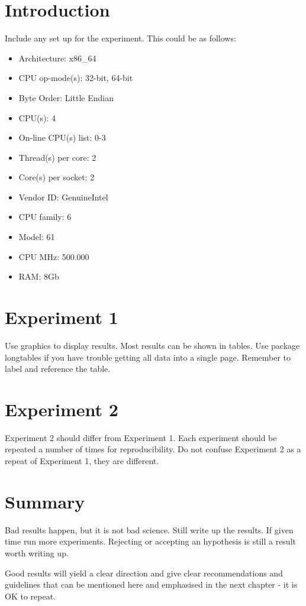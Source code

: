 \section{Introduction}
Include any set up for the experiment. This could be as follows:
\begin{itemize}
\item Architecture:          x86\_64
\item CPU op-mode(s):        32-bit, 64-bit
\item Byte Order:            Little Endian
\item CPU(s):                4
\item On-line CPU(s) list:   0-3
\item Thread(s) per core:    2
\item Core(s) per socket:    2
\item Vendor ID:             GenuineIntel
\item CPU family:            6
\item Model:                 61
\item CPU MHz:               500.000
\item RAM:					 8Gb
\end{itemize}
\section{Experiment 1}
Use graphics to display results. Most results can be shown in tables. Use package longtables if you have trouble getting all data into a single page. Remember to label and reference the table.

\section{Experiment 2}
Experiment 2 should differ from Experiment 1. Each experiment should be repeated a number of times for reproducibility. Do not confuse Experiment 2 as a repeat of Experiment 1, they are different. 

\section{Summary}
Bad results happen, but it is not bad science. Still write up the results. If given time run more experiments. Rejecting or accepting an hypothesis is still a result worth writing up.

Good results will yield a clear direction and give clear recommendations and guidelines that can be mentioned here and emphasised in the next chapter \-- it is OK to repeat.


